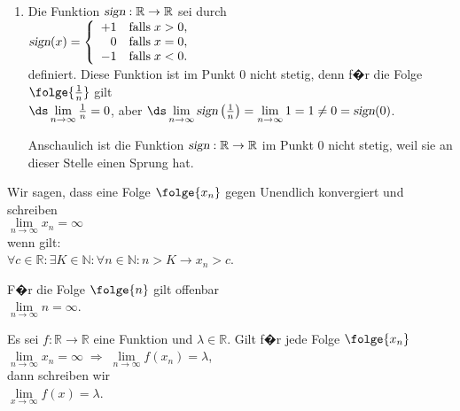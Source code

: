 \begin{enumerate}
\item Die Funktion $\textsl{sign}:\mathbb{R} \rightarrow \mathbb{R}$ sei durch
      \\[0.2cm]
      \hspace*{1.3cm}      
      $\textsl{sign}(x) = \left\{
       \begin{array}{rl}
        +1 & \mbox{falls}\; x > 0, \\
         0 & \mbox{falls}\; x = 0, \\
        -1 & \mbox{falls}\; x < 0. \\
       \end{array}\right.
      $
      \\[0.2cm]
      definiert. Diese Funktion ist im Punkt $0$ nicht stetig, denn f�r die Folge
      $\folge{\frac{1}{n}}$ gilt
      \\[0.2cm]
      \hspace*{1.3cm}      
      $\ds \lim\limits_{n\rightarrow\infty} \frac{1}{n} = 0$, \quad aber \quad
      $\ds \lim\limits_{n\rightarrow\infty} \textsl{sign}\left(\frac{1}{n}\right) =
       \lim\limits_{n\rightarrow\infty} 1 = 1 \not= 0 = \textsl{sign}(0)$. 

       Anschaulich ist die Funktion $\textsl{sign}:\mathbb{R} \rightarrow \mathbb{R}$  im Punkt
       0 nicht stetig, weil sie an dieser Stelle einen Sprung hat.
       \eox
\end{enumerate}

\begin{Definition}
Wir sagen, dass eine Folge  $\folge{x_n}$ gegen Unendlich konvergiert und schreiben 
\\[0.2cm]
\hspace*{1.3cm}      
$\lim\limits_{n\rightarrow\infty} x_n = \infty$
\\[0.2cm]
wenn gilt:
\\[0.2cm]
\hspace*{1.3cm}      
$\forall c \in \mathbb{R}: \exists K \in \mathbb{N}: \forall n \in \mathbb{N}: 
       n > K \rightarrow x_n > c$.
\eod
\end{Definition}

\example  
F�r die Folge $\folge{n}$ gilt offenbar 
\\[0.2cm]
\hspace*{1.3cm}      
$\lim\limits_{n\rightarrow\infty} n = \infty$.
\eox

\begin{Definition}
Es sei $f:\mathbb{R} \rightarrow \mathbb{R}$ eine Funktion und $\lambda\in \mathbb{R}$.
Gilt f�r jede Folge $\folge{x_n}$
\\[0.2cm]
\hspace*{1.3cm}      
$\lim\limits_{n\rightarrow\infty} x_n = \infty \;\Rightarrow\;
     \lim\limits_{n\rightarrow\infty} f(x_n) = \lambda$,
\\[0.2cm]
dann schreiben wir 
\\[0.2cm]
\hspace*{1.3cm}      
$\lim\limits_{x\rightarrow\infty} f(x) = \lambda$.
\eod
\end{Definition}
\pagebreak

